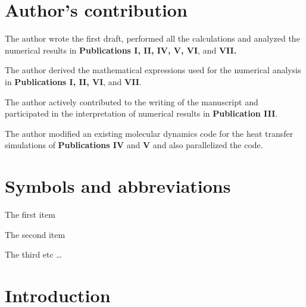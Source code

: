 \documentclass[dissertation]{aaltoseries}
\newcommand{\listofsymbols}{%
  \chapter*{Symbols and abbreviations}%
}
\begin{document}

\tableofcontents

\listofpublications

\chapter*{Author's contribution}
The author wrote the first draft, performed all the calculations and analyzed the numerical results in \textbf{Publications I, II, IV, V, VI}, and \textbf{VII.}
\vspace{1cm}

\hspace{-3mm}The author derived the mathematical expressions used for the numerical analysis in \textbf{Publications I, II, VI}, and \textbf{VII}.
\vspace{1cm}

\hspace{-3mm}The author actively contributed to the writing of the manuscript and participated in the interpretation of numerical results in \textbf{Publication III}.
\vspace{1cm}

\hspace{-3mm}The author modified an existing molecular dynamics code for the heat transfer simulations of \textbf{Publications IV} and \textbf{V} and also parallelized the code.

\listofsymbols


\begin{description} \itemsep2pt
  \item[First] The first item
  \item[$\int$ Second] The second item
  \item[Third] The third etc \ldots
\end{description}

\chapter{Introduction}
\setcounter{page}{1}




% 
\end{document}
